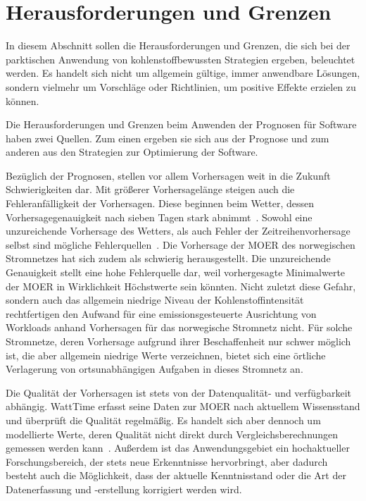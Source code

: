 \section{Herausforderungen und Grenzen}
In diesem Abschnitt sollen die Herausforderungen und Grenzen, die sich bei der parktischen Anwendung von kohlenstoffbewussten Strategien ergeben, beleuchtet werden.
Es handelt sich nicht um allgemein gültige, immer anwendbare Lösungen, sondern vielmehr um Vorschläge oder Richtlinien, um positive Effekte erzielen zu können.

Die Herausforderungen und Grenzen beim Anwenden der Prognosen für Software haben zwei Quellen.
Zum einen ergeben sie sich aus der Prognose und zum anderen aus den Strategien zur Optimierung der Software.

Bezüglich der Prognosen, stellen vor allem Vorhersagen weit in die Zukunft Schwierigkeiten dar.
Mit größerer Vorhersagelänge steigen auch die Fehleranfälligkeit der Vorhersagen.
Diese beginnen beim Wetter, dessen Vorhersagegenauigkeit nach sieben Tagen stark abnimmt~\cite{Lam.2022}.
Sowohl eine unzureichende Vorhersage des Wetters, als auch Fehler der Zeitreihenvorhersage selbst sind mögliche Fehlerquellen~\cite{Wiesner.2021}.
Die Vorhersage der \ac{MOER} des norwegischen Stromnetzes hat sich zudem als schwierig herausgestellt.
Die unzureichende Genauigkeit stellt eine hohe Fehlerquelle dar, weil vorhergesagte Minimalwerte der \ac{MOER} in Wirklichkeit Höchstwerte sein könnten.
Nicht zuletzt diese Gefahr, sondern auch das allgemein niedrige Niveau der Kohlenstoffintensität rechtfertigen den Aufwand für eine emissionsgesteuerte Ausrichtung von Workloads anhand Vorhersagen für das norwegische Stromnetz nicht.
Für solche Stromnetze, deren Vorhersage aufgrund ihrer Beschaffenheit nur schwer möglich ist, die aber allgemein niedrige Werte verzeichnen, bietet sich eine örtliche Verlagerung von ortsunabhängigen Aufgaben in dieses Stromnetz an.

Die Qualität der Vorhersagen ist stets von der Datenqualität- und verfügbarkeit abhängig.
WattTime erfasst seine Daten zur \ac{MOER} nach aktuellem Wissensstand und überprüft die Qualität regelmäßig.
Es handelt sich aber dennoch um modellierte Werte, deren Qualität nicht direkt durch Vergleichsberechnungen gemessen werden kann~\cite{WattTime.2022}.
Außerdem ist das Anwendungsgebiet ein hochaktueller Forschungsbereich, der stets neue Erkenntnisse hervorbringt, aber dadurch besteht auch die Möglichkeit, dass der aktuelle Kenntnisstand oder die Art der Datenerfassung und -erstellung korrigiert werden wird.

